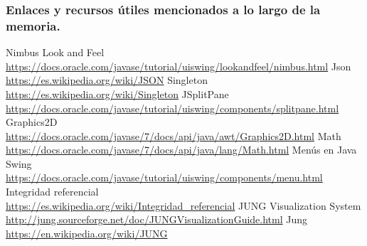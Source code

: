 \begin{thebibliography}{9}
\subsubsection*{Enlaces y recursos útiles mencionados a lo largo de la memoria.}

Nimbus Look and Feel
\\\url{https://docs.oracle.com/javase/tutorial/uiswing/lookandfeel/nimbus.html}
Json
\\\url{https://es.wikipedia.org/wiki/JSON}
Singleton
\\\url{https://es.wikipedia.org/wiki/Singleton}
JSplitPane
\\\url{https://docs.oracle.com/javase/tutorial/uiswing/components/splitpane.html}
Graphics2D
\\\url{https://docs.oracle.com/javase/7/docs/api/java/awt/Graphics2D.html}
Math
\\\url{https://docs.oracle.com/javase/7/docs/api/java/lang/Math.html}
Menús en Java Swing
\\\url{https://docs.oracle.com/javase/tutorial/uiswing/components/menu.html}
Integridad referencial
\\\url{https://es.wikipedia.org/wiki/Integridad_referencial}
JUNG Visualization System
\\\url{http://jung.sourceforge.net/doc/JUNGVisualizationGuide.html}
Jung
\\\url{https://en.wikipedia.org/wiki/JUNG}
\end{thebibliography}